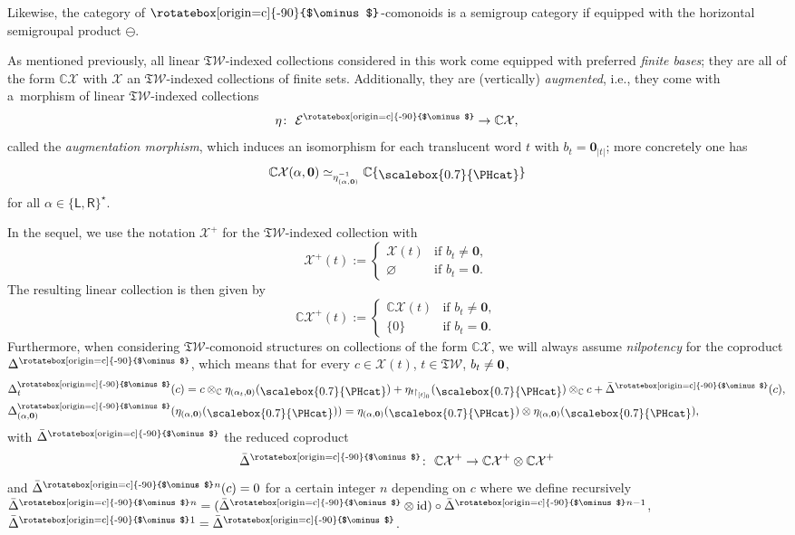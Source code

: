 \documentclass[pdftex]{sigma}
\newcommand\overt{\mathbin{\text{\rotatebox[origin=c]{-90}{$\ominus$}}}}
\renewcommand{\restriction}[2]{{#1\mathbin{\upharpoonright}_{#2}}}
\newcommand{\linearspan}[1]{{\CC #1}}
\def\uvert{{\mathcal{E}}^{\overt}}
\newcommand{\SWc}{{\mathfrak{T}\mathcal{W}}}
\newcommand{\vcp}{\Delta^{\overt}}
\newcommand{\bvcp}{\bar{\Delta}^{\overt}}
\newcommand\LL{{\mathsf{L}}}
\newcommand\RR{{\mathsf{R}}}
\def\CC{\mathbb{C}}
\newcommand{\Singleton}{\raisebox{-2pt}{\scalebox{0.7}{\PHcat}}}
\numberwithin{equation}{section}
\begin{document}
Likewise, the category of $\overt$-comonoids is a semigroup category if equipped with the horizontal semigroupal product $\ominus$.

As mentioned previously, all linear $\SWc$-indexed collections considered in this work come equipped with preferred \emph{finite bases}; they are all of the form $\linearspan{\mathcal{X}}$ with $\mathcal{X}$ an $\SWc$-indexed collections of finite sets. Additionally, they are (vertically) {\it augmented}, i.e., they come with a~morphism of linear $\SWc$-indexed collections
\[
	\eta\colon \ \uvert \to \linearspan{\mathcal{X}},
\]
called the \emph{augmentation morphism}, which induces an isomorphism for each translucent word $t$ with $b_t=\mathbf{0}_{|t|}$; more concretely one has
\begin{equation*}
	\linearspan{\mathcal X}{(\alpha,\mathbf{0})} \simeq_{\eta_{(\alpha,\mathbf{0})}^{-1}} \linearspan{\{\Singleton\}}
\end{equation*}
for all $\alpha\in\{\LL,\RR\}^\star$.

In the sequel, we use the notation ${\mathcal{X}}^+$ for the $\SWc$-indexed collection with
\begin{equation}
 \label{eq:Xplus}
	{\mathcal X^+}(t):=\begin{cases}
 {\mathcal X}(t) &\text{if $b_t\neq \mathbf{0}$},\\
	 \varnothing &\text{if $b_t= \mathbf{0}$}.
	\end{cases}
\end{equation}
The resulting linear collection is then given by
\begin{equation*}
	\linearspan{\mathcal X^+}(t):=\begin{cases}
 \linearspan{\mathcal X}(t) &\text{if $b_t\neq \mathbf{0}$},\\
	 \{0\} &\text{if $b_t= \mathbf{0}$}.
	\end{cases}
\end{equation*}
Furthermore, when considering $\SWc$-comonoid structures on collections of the form $\linearspan{\mathcal X}$, we will always assume \emph{nilpotency} for the coproduct $\vcp$, which means that for every $c \in \mathcal{X}(t)$, $t \in \SWc$, $b_t\neq {\bf 0}$,
\begin{align*}
	 & \vcp_t(c) = c\otimes_\CC \eta_{(\alpha_t,\mathbf{0})}(\Singleton) + \eta_{\restriction{t}{[t]_0}}(\Singleton) \otimes_{\CC} c + \bvcp(c), \\
	 & \vcp_{(\alpha,{\bf 0})}(\eta_{(\alpha,{\bf 0})}(\Singleton)) = \eta_{(\alpha,{\bf 0})}(\Singleton) \otimes \eta_{(\alpha,{\bf 0})}(\Singleton),
\end{align*}
with ${\bvcp}$ the reduced coproduct
\begin{equation*}
	\bvcp\colon \ \linearspan{\mathcal{X}}^+ \to \linearspan{\mathcal{X}}^+ \otimes \linearspan{\mathcal{X}}^+
\end{equation*}
and $\bvcp{}^n(c) = 0$ for a certain integer $n$ depending on $c$ where we define recursively $\bvcp{}^n = ({\bvcp} \otimes \mathrm{id}) \circ \bvcp{}^{n-1}$, ${\bvcp}{}^1=\bvcp$.
\end{document}
